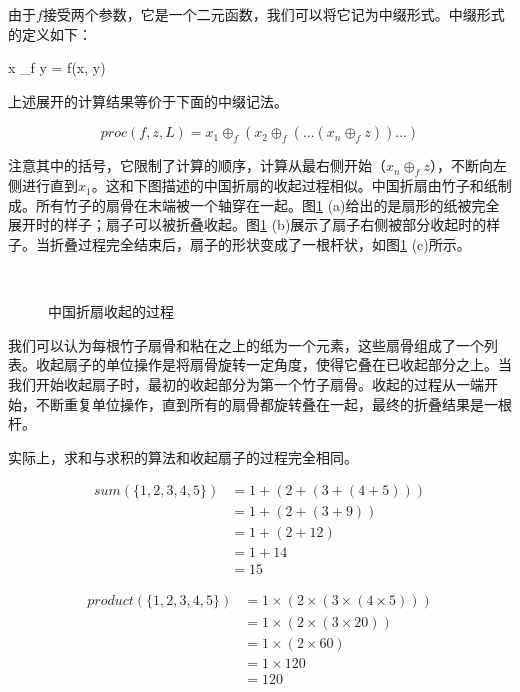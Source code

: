 \documentclass[b5paper]{ctexart}
\begin{document}
由于$f$接受两个参数，它是一个二元函数，我们可以将它记为中缀形式。中缀形式的定义如下：

\be
x \oplus_f y = f(x, y)
\ee

上述展开的计算结果等价于下面的中缀记法。

\[
proc(f, z, L) = x_1 \oplus_f (x_2 \oplus_f (... (x_n \oplus_f z))...)
\]

注意其中的括号，它限制了计算的顺序，计算从最右侧开始（$x_n \oplus_f z$），不断向左侧进行直到$x_1$。这和下图描述的中国折扇的收起过程相似。中国折扇由竹子和纸制成。所有竹子的扇骨在末端被一个轴穿在一起。图\ref{fig:fold-fan} (a)给出的是扇形的纸被完全展开时的样子；扇子可以被折叠收起。图\ref{fig:fold-fan} (b)展示了扇子右侧被部分收起时的样子。当折叠过程完全结束后，扇子的形状变成了一根杆状，如图\ref{fig:fold-fan} (c)所示。

\begin{figure}[htbp]
    \centering
     \\
    \caption{中国折扇收起的过程} \label{fig:fold-fan}
\end{figure}

我们可以认为每根竹子扇骨和粘在之上的纸为一个元素，这些扇骨组成了一个列表。收起扇子的单位操作是将扇骨旋转一定角度，使得它叠在已收起部分之上。当我们开始收起扇子时，最初的收起部分为第一个竹子扇骨。收起的过程从一端开始，不断重复单位操作，直到所有的扇骨都旋转叠在一起，最终的折叠结果是一根杆。

实际上，求和与求积的算法和收起扇子的过程完全相同。

\[
\begin{array}{rl}
sum(\{1, 2, 3, 4, 5 \}) & = 1 + (2 + (3 + (4 + 5))) \\
         & = 1 + (2 + (3 + 9)) \\
         & = 1 + (2 + 12) \\
         & = 1 + 14 \\
         & = 15
\end{array}
\]

\[
\begin{array}{rl}
product(\{1, 2, 3, 4, 5 \}) & = 1 \times (2 \times (3 \times (4 \times 5))) \\
         & = 1 \times (2 \times (3 \times 20)) \\
         & = 1 \times (2 \times 60) \\
         & = 1 \times 120 \\
         & = 120
\end{array}
\]
\end{document}
